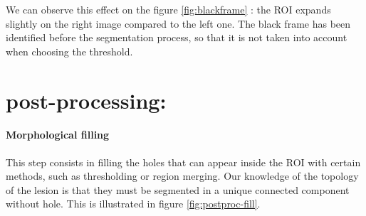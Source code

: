 \documentclass[a4paper,10pt]{article}
\begin{document}
We can observe this effect on the figure \ref{fig:blackframe} : the ROI expands slightly on the right image compared to the left one. The black frame has been identified before the segmentation process, so that it is not taken into account when choosing the threshold.




\section{post-processing:}
\paragraph{Morphological filling} This step consists in filling the holes that can appear inside the ROI with certain methods, such as thresholding or region merging. Our knowledge of the topology of the lesion is that they must be segmented in a unique connected component without hole. This is illustrated in figure \ref{fig:postproc-fill}.
\end{document}
